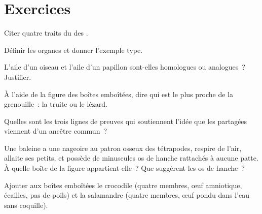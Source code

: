 \section{Exercices}

\begin{exercise}[$\star$]\label{exo:g10:common-ancestry:1}
Citer quatre traits du  des .
\end{exercise}

\begin{exercise}[$\star$]\label{exo:g10:common-ancestry:2}
Définir les organes  et donner l'exemple type.
\end{exercise}

\begin{exercise}[$\star$]\label{exo:g10:common-ancestry:3}
L'aile d'un oiseau et l'aile d'un papillon sont-elles homologues ou
analogues~? Justifier.
\end{exercise}

\begin{exercise}[$\star$]\label{exo:g10:common-ancestry:4}
À l'aide de la figure des boîtes emboîtées, dire qui est le plus proche
de la grenouille~: la truite ou le lézard.
\end{exercise}

\begin{exercise}[$\star$]\label{exo:g10:common-ancestry:5}
Quelles sont les trois lignes de preuves qui soutiennent l'idée que les
 partagées viennent d'un ancêtre commun~?
\end{exercise}

\begin{exercise}[$\star\star$]\label{exo:g10:common-ancestry:6}
Une baleine a une nageoire au patron osseux des tétrapodes, respire de
l'air, allaite ses petits, et possède de minuscules os de hanche
rattachés à aucune patte. À quelle boîte de la figure appartient-elle~?
Que suggèrent les os de hanche~?
\end{exercise}

\begin{exercise}[$\star\star$]\label{exo:g10:common-ancestry:7}
Ajouter aux boîtes emboîtées le crocodile (quatre membres, œuf
amniotique, écailles, pas de poils) et la salamandre (quatre membres,
œuf pondu dans l'eau sans coquille).
\end{exercise}

